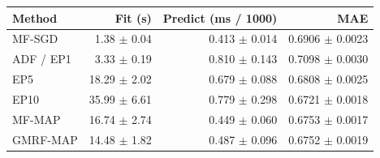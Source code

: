 \begin{tabular}{@{}lrrr@{}}\toprule
Method & Fit (s) & Predict (ms / 1000) & MAE\\\midrule
MF-SGD & 1.38 $\pm$ 0.04 & 0.413 $\pm$ 0.014 & 0.6906 $\pm$ 0.0023\\
ADF / EP1 & 3.33 $\pm$ 0.19 & 0.810 $\pm$ 0.143 & 0.7098 $\pm$ 0.0030\\
EP5 & 18.29 $\pm$ 2.02 & 0.679 $\pm$ 0.088 & 0.6808 $\pm$ 0.0025\\
EP10 & 35.99 $\pm$ 6.61 & 0.779 $\pm$ 0.298 & 0.6721 $\pm$ 0.0018\\
MF-MAP & 16.74 $\pm$ 2.74 & 0.449 $\pm$ 0.060 & 0.6753 $\pm$ 0.0017\\
GMRF-MAP & 14.48 $\pm$ 1.82 & 0.487 $\pm$ 0.096 & 0.6752 $\pm$ 0.0019\\
\bottomrule\end{tabular}
